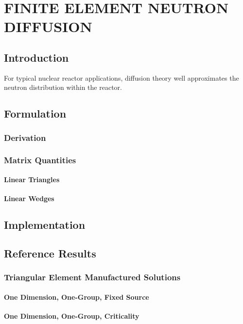 \chapter{FINITE ELEMENT NEUTRON DIFFUSION}
\label{ch:neutronDiffusion}

\section{Introduction}
  For typical nuclear reactor applications, diffusion theory well approximates the neutron distribution within the reactor.

\section{Formulation}
  \subsection{Derivation}
  \subsection{Matrix Quantities}
    \subsubsection{Linear Triangles}
    \subsubsection{Linear Wedges}

\section{Implementation}

\section{Reference Results}
  \subsection{Triangular Element Manufactured Solutions}
    \subsubsection{One Dimension, One-Group, Fixed Source}
    \subsubsection{One Dimension, One-Group, Criticality}
